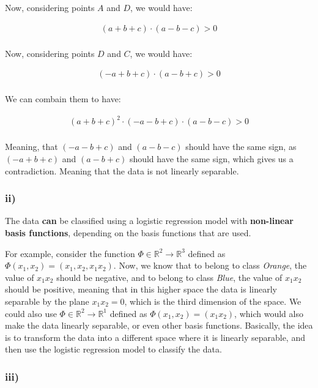 \documentclass[12pt,a4paper,oneside]{paper}
\begin{document}
Now, considering points $A$ and $D$, we would have:

\begin{align*}
    (a + b + c) \cdot ( a - b - c) > 0 \\
\end{align*}

Now, considering points $D$ and $C$, we would have:

\begin{align*}
    (- a + b + c) \cdot (a - b + c) > 0 \\
\end{align*}

We can combain them to have:

\begin{align*}
    (a + b + c)^2 \cdot (-a - b + c) \cdot ( a - b - c) > 0 \\ 
\end{align*}

Meaning, that $(- a - b + c)$ and $(a - b - c)$ should have the same sign, as $(- a + b + c)$ and $(a - b + c)$ should have the same sign,
which gives us a contradiction. Meaning that the data is not linearly separable.

\newpage
\subsubsection*{ii)}

The data \textbf{can} be classified using a logistic regression model with \textbf{non-linear basis functions},
depending on the basis functions that are used.

For example, consider the function $\Phi \in \mathbb{R}^2 \rightarrow \mathbb{R}^3$ defined as $\Phi(x_1, x_2) = (x_1, x_2, x_1 x_2)$.
Now, we know that to belong to class \textit{Orange}, the value of $x_1 x_2$ should be negative, and to belong to class \textit{Blue}, the value of $x_1 x_2$ should be positive, 
meaning that in this higher space the data is linearly separable by the plane $x_1 x_2 = 0$, which is the third dimension of the space. 
We could also use $\Phi \in \mathbb{R}^2 \rightarrow \mathbb{R}^1$ defined as $\Phi(x_1, x_2) = (x_1 x_2)$, which would also make the data linearly separable, or even other basis functions. 
Basically, the idea is to transform the data into a different space where it is linearly separable, and then use the logistic regression model to classify the data.

\subsubsection*{iii)}
\end{document}

